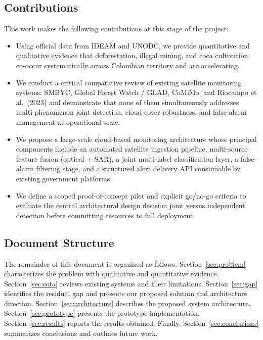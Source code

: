 \documentclass{article}
\begin{document}
\subsection{Contributions}

This work makes the following contributions at this stage of the project:

\begin{itemize}
    \item Using official data from IDEAM and UNODC, we provide quantitative and
    qualitative evidence that deforestation, illegal mining, and coca cultivation
    co-occur systematically across Colombian territory and are accelerating.
    \item We conduct a critical comparative review of existing satellite monitoring
    systems: SMBYC, Global Forest Watch / GLAD, CoMiMo, and Riocampo et al.\
    (2023) and demonstrate that none of them simultaneously addresses
    multi-phenomenon joint detection, cloud-cover robustness, and false-alarm
    management at operational scale.
    \item We propose a large-scale cloud-based monitoring architecture whose
    principal components include an automated satellite ingestion pipeline,
    multi-source feature fusion (optical + SAR), a joint multi-label
    classification layer, a false-alarm filtering stage, and a structured
    alert delivery API consumable by existing government platforms.
    \item We define a scoped proof-of-concept pilot and explicit go/no-go
    criteria to evaluate the central architectural design decision joint
    versus independent detection before committing resources to full
    deployment.
\end{itemize}

\subsection{Document Structure}

The remainder of this document is organized as follows.
Section~\ref{sec:problem} characterizes the problem with qualitative and
quantitative evidence.
Section~\ref{sec:sota} reviews existing systems and their limitations.
Section~\ref{sec:gap} identifies the residual gap and presents our proposed
solution and architecture direction.
Section~\ref{sec:architecture} describes the proposed system architecture.
Section~\ref{sec:prototype} presents the prototype implementation.
Section~\ref{sec:results} reports the results obtained.
Finally, Section~\ref{sec:conclusions} summarizes conclusions and outlines
future work.
\end{document}
